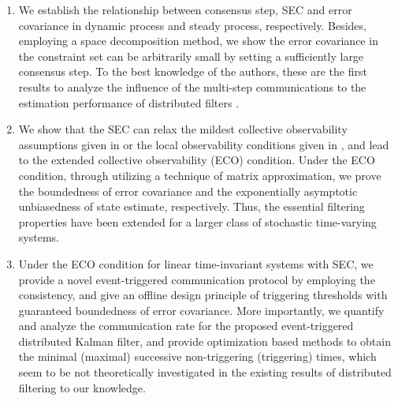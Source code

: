 \documentclass[journal,transmag]{IEEEtran}
\begin{document}
\begin{enumerate}
	


 




%		
%
%		
		
	
		
		
		
		\item 		We establish the relationship between  consensus step, SEC and  error covariance in dynamic process and steady process, respectively.
			Besides, 	employing a space decomposition method,  we show the error covariance in the constraint set can be  arbitrarily small by setting a sufficiently large  consensus step.  
			To the best knowledge of the authors, these are the first results to analyze the influence of the multi-step communications to the estimation performance of distributed filters \cite{Battistelli2016stability,Battistelli2014Kullback,Dm2015Distributed,Cat2010Diffusion}. 
		
		
		
			\item  We show that the SEC can relax the mildest collective observability assumptions given in \cite{Battistelli2014Kullback,Battistelli2015Consensus,Battistelli2016stability,Dm2015Distributed,wang2017convergence} or the local observability conditions given in \cite{olfati2009kalman,stankovic2009consensus,yang2014stochastic}, and lead to the extended collective observability (ECO) condition. Under the  ECO condition, through utilizing a technique of matrix approximation,		
			we  prove  the boundedness of error covariance and the exponentially  asymptotic unbiasedness of state estimate, respectively. 
			Thus, the essential filtering properties have been extended for a larger class of stochastic time-varying systems.
		
		

		
		
		\item  Under  the ECO condition for linear time-invariant systems with SEC, we  provide a novel event-triggered communication protocol by employing the consistency, and give an offline design principle of triggering thresholds with guaranteed boundedness of error covariance.
			More importantly,  we quantify and analyze the communication rate for the proposed event-triggered distributed Kalman filter,  and provide optimization based methods to obtain the minimal (maximal) successive non-triggering (triggering) times, which seem to be not theoretically  investigated in the existing results \cite{liu2015event,liu2015eventinformatics,Battistelli2016Distributed} of distributed filtering to our knowledge.
			

\end{enumerate}
\end{document}
